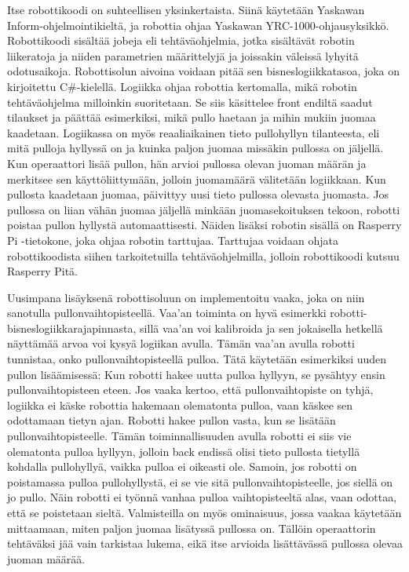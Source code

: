 Itse robottikoodi on suhteellisen yksinkertaista. Siinä käytetään Yaskawan Inform\hyp{}ohjelmointikieltä, ja robottia ohjaa Yaskawan YRC\hyp{}1000\hyp{}ohjausyksikkö. Robottikoodi sisältää jobeja eli tehtäväohjelmia, jotka sisältävät robotin liikeratoja ja niiden parametrien määrittelyjä ja joissakin väleissä lyhyitä odotusaikoja. Robottisolun aivoina voidaan pitää sen bisneslogiikkatasoa, joka on kirjoitettu C\#-kielellä. Logiikka ohjaa robottia kertomalla, mikä robotin tehtäväohjelma milloinkin suoritetaan. Se siis käsittelee front endiltä saadut tilaukset ja päättää esimerkiksi, mikä pullo haetaan ja mihin mukiin juomaa kaadetaan. Logiikassa on myös reaaliaikainen tieto pullohyllyn tilanteesta, eli mitä pulloja hyllyssä on ja kuinka paljon juomaa missäkin pullossa on jäljellä. Kun operaattori lisää pullon, hän arvioi pullossa olevan juoman määrän ja merkitsee sen käyttöliittymään, jolloin juomamäärä välitetään logiikkaan. Kun pullosta kaadetaan juomaa, päivittyy uusi tieto pullossa olevasta juomasta. Jos pullossa on liian vähän juomaa jäljellä minkään juomasekoituksen tekoon, robotti poistaa pullon hyllystä automaattisesti. Näiden lisäksi robotin sisällä on Rasperry Pi -tietokone, joka ohjaa robotin tarttujaa. Tarttujaa voidaan ohjata robottikoodista siihen tarkoitetuilla tehtäväohjelmilla, jolloin robottikoodi kutsuu Rasperry Pitä.

Uusimpana lisäyksenä robottisoluun on implementoitu vaaka, joka on niin sanotulla pullonvaihtopisteellä. Vaa'an toiminta on hyvä esimerkki robotti-bisneslogiikkarajapinnasta, sillä vaa'an voi kalibroida ja sen jokaisella hetkellä näyttämää arvoa voi kysyä logiikan avulla. Tämän vaa'an avulla robotti tunnistaa, onko pullonvaihtopisteellä pulloa. Tätä käytetään esimerkiksi uuden pullon lisäämisessä: Kun robotti hakee uutta pulloa hyllyyn, se pysähtyy ensin pullonvaihtopisteen eteen. Jos vaaka kertoo, että pullonvaihtopiste on tyhjä, logiikka ei käske robottia hakemaan olematonta pulloa, vaan käskee sen odottamaan tietyn ajan. Robotti hakee pullon vasta, kun se lisätään pullonvaihtopisteelle. Tämän toiminnallisuuden avulla robotti ei siis vie olematonta pulloa hyllyyn, jolloin back endissä olisi tieto pullosta tietyllä kohdalla pullohyllyä, vaikka pulloa ei oikeasti ole. Samoin, jos robotti on poistamassa pulloa pullohyllystä, ei se vie sitä pullonvaihtopisteelle, jos siellä on jo pullo. Näin robotti ei työnnä vanhaa pulloa vaihtopisteeltä alas, vaan odottaa, että se poistetaan sieltä. Valmisteilla on myös ominaisuus, jossa vaakaa käytetään mittaamaan, miten paljon juomaa lisätyssä pullossa on. Tällöin operaattorin tehtäväksi jää vain tarkistaa lukema, eikä itse arvioida lisättävässä pullossa olevaa juoman määrää.
